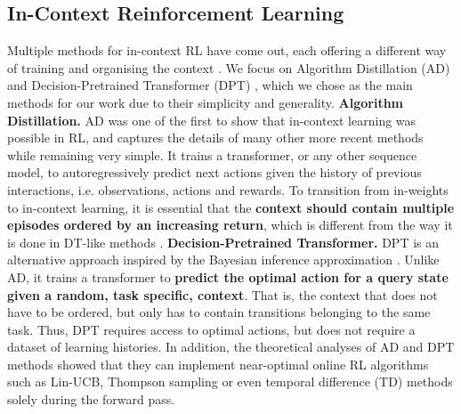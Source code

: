 \documentclass{article}
\begin{document}
\subsection{In-Context Reinforcement Learning}
Multiple methods for in-context RL have come out, each offering a different way of training and organising the context \citep{laskin2022context, lee2023supervised, mirchandani2023large, liu2023emergent, raparthy2023generalization, shi2024cross}. We focus on Algorithm Distillation (AD) \citep{laskin2022context} and Decision-Pretrained Transformer (DPT) \citep{lee2023supervised}, which we chose as the main methods for our work due to their simplicity and generality.
\textbf{Algorithm Distillation.} AD \citep{laskin2022context} was one of the first to show that in-context learning was possible in RL, and captures the details of many other more recent methods \citep{mirchandani2023large, liu2023emergent, shi2024cross} while remaining very simple. It trains a transformer, or any other sequence model, to autoregressively predict next actions given the history of previous interactions, i.e. observations, actions and rewards. To transition from in-weights to in-context learning, it is essential that the \textbf{context should contain multiple episodes ordered by an increasing return}, which is different from the way it is done in DT-like methods \citep{chen2021decision, janner2021offline, lee2022multi}.
\textbf{Decision-Pretrained Transformer.} DPT is an alternative approach inspired by the Bayesian inference approximation \citep{muller2021transformers}. Unlike AD, it trains a transformer to \textbf{predict the optimal action for a query state given a random, task specific, context}. That is, the context that does not have to be ordered, but only has to contain transitions belonging to the same task. Thus, DPT requires access to optimal actions, but does not require a dataset of learning histories.
In addition, the theoretical analyses of AD and DPT methods \citep{lin2023transformers, wang2024transformers} showed that they can implement near-optimal online RL algorithms such as Lin-UCB, Thompson sampling or even temporal difference (TD) methods solely during the forward pass.
\end{document}
